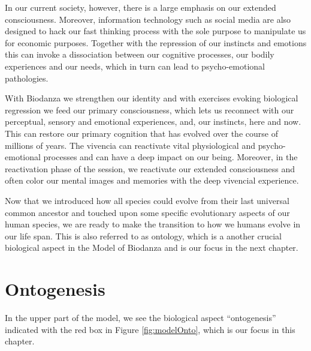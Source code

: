 \documentclass[
  11pt,
]{book}
\begin{document}
In our current society, however, there is a large emphasis on our extended consciousness. Moreover, information technology such as social media are also designed to hack our fast thinking process with the sole purpose to manipulate us for economic purposes. Together with the repression of our instincts and emotions this can invoke a dissociation between our cognitive processes, our bodily experiences and our needs, which in turn can lead to psycho-emotional pathologies.

With Biodanza we strengthen our identity and with exercises evoking biological regression we feed our primary consciousness, which lets us reconnect with our perceptual, sensory and emotional experiences, and, our instincts, here and now. This can restore our primary cognition that has evolved over the course of millions of years. The vivencia can reactivate vital physiological and psycho-emotional processes and can have a deep impact on our being. Moreover, in the reactivation phase of the session, we reactivate our extended consciousness and often color our mental images and memories with the deep vivencial experience.

Now that we introduced how all species could evolve from their last universal common ancestor and touched upon some specific evolutionary aspects of our human species, we are ready to make the transition to how we humans evolve in our life span. This is also referred to as ontology, which is a another crucial biological aspect in the Model of Biodanza and is our focus in the next chapter.

\hypertarget{ontogenesis}{%
\chapter{Ontogenesis}\label{ontogenesis}}

In the upper part of the model, we see the biological aspect ``ontogenesis'' indicated with the red box in Figure \ref{fig:modelOnto}, which is our focus in this chapter.
\end{document}
